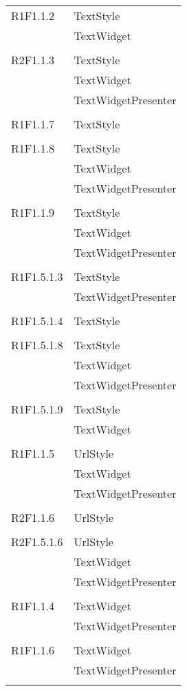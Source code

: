 \begin{center}
\begin{longtable}{|p{7cm}|p{7cm}|}
		R1F1.1.2 & TextStyle \\ & TextWidget \\ & \\ \hline
		R2F1.1.3 & TextStyle \\ & TextWidget \\ & TextWidgetPresenter \\ & \\ \hline
		R1F1.1.7 & TextStyle \\ & \\ \hline
		R1F1.1.8 & TextStyle \\ & TextWidget \\ & TextWidgetPresenter \\ & \\ \hline
		R1F1.1.9 & TextStyle \\ & TextWidget \\ & TextWidgetPresenter \\ & \\ \hline
		R1F1.5.1.3 & TextStyle \\ & TextWidgetPresenter \\ & \\ \hline
		R1F1.5.1.4 & TextStyle \\ & \\ \hline
		R1F1.5.1.8 & TextStyle \\ & TextWidget \\ & TextWidgetPresenter \\ & \\ \hline
		R1F1.5.1.9 & TextStyle \\ & TextWidget \\ & \\ \hline
		R1F1.1.5 & UrlStyle \\ & TextWidget \\ & TextWidgetPresenter \\ & \\ \hline
		R2F1.1.6 & UrlStyle \\ & \\ \hline
		R2F1.5.1.6 & UrlStyle \\ & TextWidget \\ & TextWidgetPresenter \\ & \\ \hline
		R1F1.1.4 & TextWidget \\ & TextWidgetPresenter \\ & \\ \hline
		R1F1.1.6 & TextWidget \\ & TextWidgetPresenter \\ & \\ \hline

\end{longtable}
\end{center}
